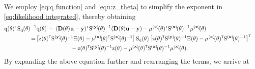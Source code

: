 %
%
We employ \eqref{eq:q function} and \eqref{eqn:z_theta} to simplify the exponent in \eqref{eq:likelihood integrated}, thereby obtaining
\begin{align}
        \vcq(\vctheta)^\tr\Sqtheta^{-1}&\vcq(\vctheta)\, - \, (\mathbf{D}(\vctheta)\mathbf{u}-\mathbf{y})^\tr\Sbfytheta^{-1}(\mathbf{D}(\vctheta)\mathbf{u}-\mathbf{y}) - \mubfxtheta^\tr\Sbfxtheta^{-1}\mubfxtheta
        \\
        =\,& 
        \big[ \vcz(\vctheta)^\tr\Sbfytheta^{-1}\Xi(\vctheta) - \mubfxtheta^\tr\Sbfxtheta^{-1}\big]
        \, \Sqtheta\, 
        \big[ \vcz(\vctheta)^\tr\Sbfytheta^{-1}\Xi(\vctheta) - \mubfxtheta^\tr\Sbfxtheta^{-1} \big]^\tr
        \nonumber
        \\&
        \qquad\qquad\qquad
        - \vcz(\vctheta)^\tr\Sbfytheta^{-1}\vcz(\vctheta) - \mubfxtheta^\tr\Sbfxtheta^{-1}\mubfxtheta.
\end{align}
By expanding the above equation further and rearranging the terms, we arrive at

